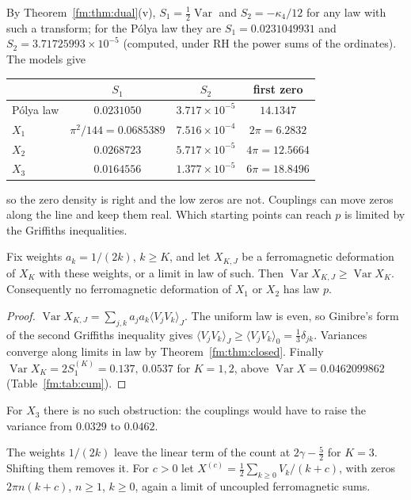 By Theorem~\ref{fm:thm:dual}(v), $S_1=\frac12\operatorname{Var}$ and $S_2=-\kappa_4/12$ for any law with such a transform; for the P\'olya law they are $S_1=0.0231049931$ and $S_2=3.71725993\times10^{-5}$ (computed, under RH the power sums of the ordinates). The models give

\begin{center}\small
\begin{tabular}{@{}lccc@{}}
\toprule
 & $S_1$ & $S_2$ & first zero\\
\midrule
P\'olya law & $0.0231050$ & $3.717\times10^{-5}$ & $14.1347$\\
$X_1$ & $\pi^2/144=0.0685389$ & $7.516\times10^{-4}$ & $2\pi=6.2832$\\
$X_2$ & $0.0268723$ & $5.717\times10^{-5}$ & $4\pi=12.5664$\\
$X_3$ & $0.0164556$ & $1.377\times10^{-5}$ & $6\pi=18.8496$\\
\bottomrule
\end{tabular}
\end{center}

so the zero density is right and the low zeros are not. Couplings can move zeros along the line and keep them real. Which starting points can reach $p$ is limited by the Griffiths inequalities.

\begin{proposition}[proved]\label{fm:prop:gks}
Fix weights $a_k=1/(2k)$, $k\ge K$, and let $X_{K,J}$ be a ferromagnetic deformation of $X_K$ with these weights, or a limit in law of such. Then $\operatorname{Var}X_{K,J}\ge\operatorname{Var}X_K$. Consequently no ferromagnetic deformation of $X_1$ or $X_2$ has law $p$.
\end{proposition}

\begin{proof}
$\operatorname{Var}X_{K,J}=\sum_{j,k}a_ja_k\langle V_jV_k\rangle_J$. The uniform law is even, so Ginibre's form of the second Griffiths inequality \cite{Ginibre70} gives $\langle V_jV_k\rangle_J\ge\langle V_jV_k\rangle_0=\frac13\delta_{jk}$. Variances converge along limits in law by Theorem~\ref{fm:thm:closed}. Finally $\operatorname{Var}X_K=2S_1^{(K)}=0.137,\ 0.0537$ for $K=1,2$, above $\operatorname{Var}X=0.0462099862$ (Table~\ref{fm:tab:cum}).
\end{proof}

For $X_3$ there is no such obstruction: the couplings would have to raise the variance from $0.0329$ to $0.0462$.

The weights $1/(2k)$ leave the linear term of the count at $2\gamma-\frac52$ for $K=3$. Shifting them removes it. For $c>0$ let $X^{(c)}=\frac12\sum_{k\ge0}V_k/(k+c)$, with zeros $2\pi n(k+c)$, $n\ge1$, $k\ge0$, again a limit of uncoupled ferromagnetic sums.

